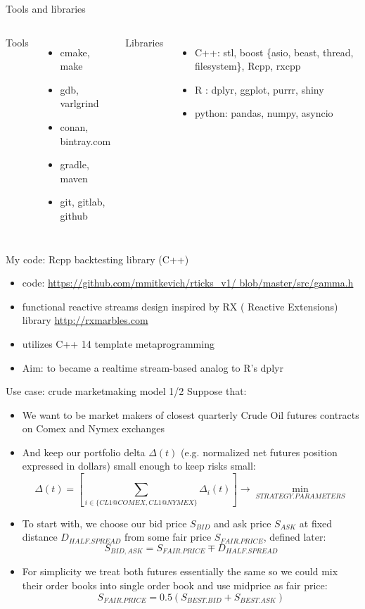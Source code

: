 \documentclass[10pt]{beamer}
\begin{document}
\begin{frame}{Tools and libraries}
\begin{columns}[T,onlytextwidth]
	Tools 
	\begin{itemize}
		\item cmake, make
		\item gdb, varlgrind
		\item conan, bintray.com
		\item gradle, maven
		\item git, gitlab, github
	\end{itemize}	
	Libraries
	\begin{itemize}
		\item C++: stl, boost \{asio, beast, thread, filesystem\}, Rcpp, rxcpp
		\item R : dplyr, ggplot, purrr, shiny
		\item python: pandas, numpy, asyncio
	\end{itemize}
\end{columns}
\end{frame}

\begin{frame}{My code: Rcpp backtesting library (C++)}
\begin{itemize}
	\item code: \href{https://github.com/mmitkevich/rticks_v1/blob/master/src/gamma.h} {https://github.com/mmitkevich/rticks\_v1/
		blob/master/src/gamma.h}
	\item functional reactive streams design inspired by RX ( Reactive Extensions) library \href{http://rxmarbles.com}{http://rxmarbles.com}
	\item utilizes C++ 14 template metaprogramming 
	\item Aim: to became a realtime stream-based analog to R's dplyr
\end{itemize}
\end{frame}

\begin{frame}{Use case: crude marketmaking model 1/2}
Suppose that:
\begin{itemize}
\item We want to be market makers of closest quarterly Crude Oil futures contracts on Comex and Nymex exchanges
\item And keep our portfolio delta $\Delta(t)$ (e.g. normalized net futures position expressed in dollars) small enough to keep risks small:
$$
	\Delta(t)=[\sum_{i\in \{CL1@COMEX,CL1@NYMEX\}} \Delta_{i}(t) ] \rightarrow \min_{STRATEGY.PARAMETERS}
$$
\item To start with, we choose our bid price $S_{BID}$ and ask price $S_{ASK}$ at fixed distance $D_{HALF.SPREAD}$ from some fair price $S_{FAIR.PRICE}$, defined later:
$$
	S_{BID,ASK} = S_{FAIR.PRICE}  \mp D_{HALF.SPREAD} 
$$
\item For simplicity we treat both futures essentially the same so we could mix their order books into single order book and use midprice as fair price:
$$
   S_{FAIR.PRICE} = 0.5(S_{BEST.BID}+S_{BEST.ASK})
$$
\end{itemize}
\end{frame}
\end{document}
